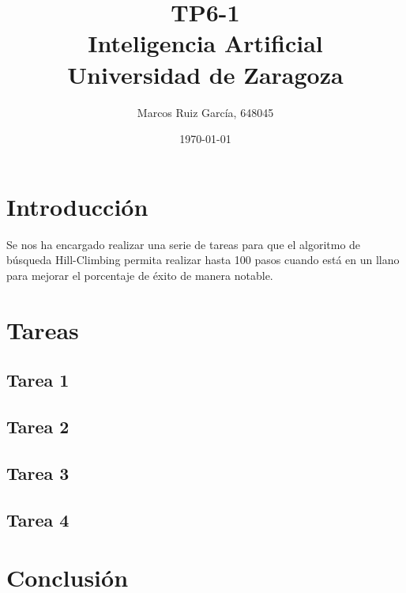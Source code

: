 \documentclass[a4paper]{article}
\title{TP6-1 \\ Inteligencia Artificial \\ \large Universidad de Zaragoza}
\author{Marcos Ruiz García, 648045}
\date{\today}
\begin{document}
\maketitle


\section{Introducción}
Se nos ha encargado realizar una serie de tareas para que el algoritmo de búsqueda Hill-Climbing permita realizar hasta 100 pasos cuando está en un llano para mejorar el porcentaje de éxito de manera notable.
\section{Tareas}
\subsection{Tarea 1}
\subsection{Tarea 2}
\subsection{Tarea 3}
\subsection{Tarea 4}

\section{Conclusión}
\end{document}
